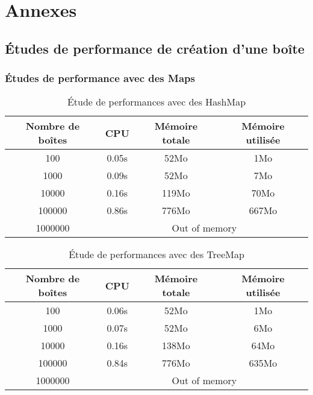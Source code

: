 
\section{Annexes}\label{sec:annexe}
\subsection{Études de performance de création d'une boîte}\label{sec:creation}
\subsubsection{Études de performance avec des Maps}

\begin{table}[h]
  \centering
\begin{tabular}{|c|c|c|c|}
\hline
Nombre de boîtes & CPU & Mémoire totale & Mémoire utilisée\\
\hline
100 & 0.05s & 52Mo & 1Mo\\
\hline
1000 & 0.09s & 52Mo & 7Mo\\
\hline
10000 & 0.16s & 119Mo & 70Mo\\
\hline
100000 & 0.86s & 776Mo & 667Mo\\
\hline
1000000 & \multicolumn{3}{|c|}{Out of memory}\\
\hline
\end{tabular}
\caption{Étude de performances avec des HashMap}
\label{tab:hashmap1}
\end{table}

\begin{table}[h]
  \centering
\begin{tabular}{|c|c|c|c|}
\hline
Nombre de boîtes & CPU & Mémoire totale & Mémoire utilisée\\
\hline
100 & 0.06s & 52Mo & 1Mo\\
\hline
1000 & 0.07s & 52Mo & 6Mo\\
\hline
10000 & 0.16s & 138Mo & 64Mo\\
\hline
100000 & 0.84s & 776Mo & 635Mo\\
\hline
1000000 & \multicolumn{3}{|c|}{Out of memory}\\
\hline
\end{tabular}
\caption{Étude de performances avec des TreeMap}
\label{tab:treemap1}
\end{table}


